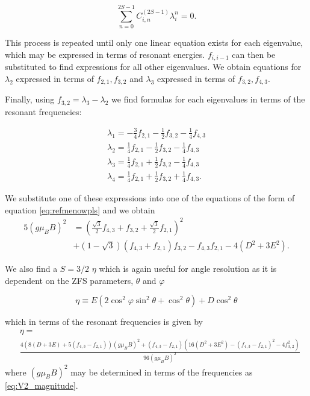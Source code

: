 \begin{equation}
	\sum_{n=0}^{2S -1} C_{i,n}^{(2S-1)} \lambda_i^n = 0.
	\label{eq:refmenowpls}
\end{equation}

This process is repeated until only one linear equation exists for each eigenvalue, which may be expressed in terms of resonant energies. $f_{i, i-1}$ can then be substituted to find expressions for all other eigenvalues.
We
obtain equations for $\lambda_2$ expressed in terms of $f_{2,1}, f_{3,2}$ and $\lambda_3$ expressed in terms of $f_{3,2}, f_{4,3}$.

Finally, using $f_{3,2} = \lambda_3 - \lambda_2$ we find formulas for each eigenvalues in terms of the resonant frequencies:

\begin{eqnarray}
	\lambda_1 = -\frac{3}{4}f_{2,1} - \frac{1}{2} f_{3,2} - \frac{1}{4} f_{4,3}\\
	\lambda_2 = \frac{1}{4}f_{2,1} - \frac{1}{2}f_{3,2} - \frac{1}{4} f_{4,3} \\
	\lambda_3 = \frac{1}{4}f_{2,1} + \frac{1}{2}f_{3,2} - \frac{1}{4} f_{4,3} \\
	\lambda_4 = \frac{1}{4}f_{2,1} + \frac{1}{2}f_{3,2} + \frac{1}{4} f_{4,3}.
\end{eqnarray}

We substitute one of these expressions into one of the equations of the form of equation \eqref{eq:refmenowpls} and we obtain
\begin{equation}
	\begin{align}
		5(g\mu_B B)^2 & =\left(\frac{\sqrt{3}}{2}f_{4,3} + f_{3,2}  + \frac{\sqrt{3}}{2}f_{2,1}\right)^2 \\
		              & +(1 - \sqrt{3}) (f_{4,3} + f_{2,1})f_{3,2} - f_{4,3}f_{2,1} - 4(D^2 + 3E^2).
	\end{align}
	\label{eq:V2_magnitude}
\end{equation}

We also find a $S=3/2$ $\eta$ which is again useful for angle resolution as it is dependent on the ZFS parameters, $\theta$ and $\varphi$

\begin{equation}
	\eta \equiv E(2\cos^2\varphi \sin^2 \theta + \cos^2\theta) + D\cos^2 \theta
	\label{eq:eta}
\end{equation}

which in terms of the resonant frequencies is given by
\begin{equation}
	\begin{align}
		 & \eta =                                                                                                                                                              \\
		 & \frac{4\left(8(D + 3E) + 5(f_{4,3}-f_{2,1})\right)(g\mu_B B)^2 + (f_{4,3} - f_{2,1})\left(16(D^2 + 3E^2) - (f_{4,3}-f_{2,1})^2 - 4f_{3,2}^2\right)}{96(g\mu_B B)^2}
	\end{align}
	\label{eq:eta_resonant}
\end{equation}
where $(g \mu_B B)^2$ may be determined in terms of the frequencies as \eqref{eq:V2_magnitude}.


